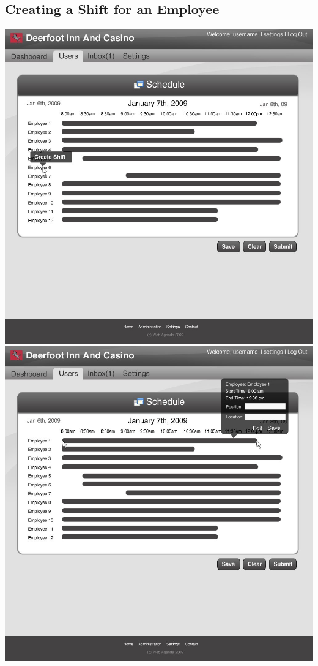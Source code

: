 \documentclass[letterpaper,12pt]{report}
\begin{document}
\begin{landscape}
\section{Creating a Shift for an Employee}
\begin{center}
 \includegraphics[scale=0.3]{prototypes/createScheduleClickEmp.jpg}
 \includegraphics[scale=0.3]{prototypes/createSchedDrag.jpg}
\end{center}



\end{landscape}
\end{document}
